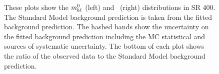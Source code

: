 \begin{figure}[ht]
  \centering
  \caption{These plots show the $m_{b\ell}^0$ (left) and \HT\ (right) distributions
    in SR 400. The Standard Model background prediction is taken from the
    fitted background prediction. The hashed bands show
    the uncertainty on the fitted background prediction including the MC
    statistical and sources of systematic uncertainty.  The bottom of
    each plot shows the ratio of the observed data to the Standard Model
    background prediction.
  }
  \label{fig:sr_dists}
\end{figure}

